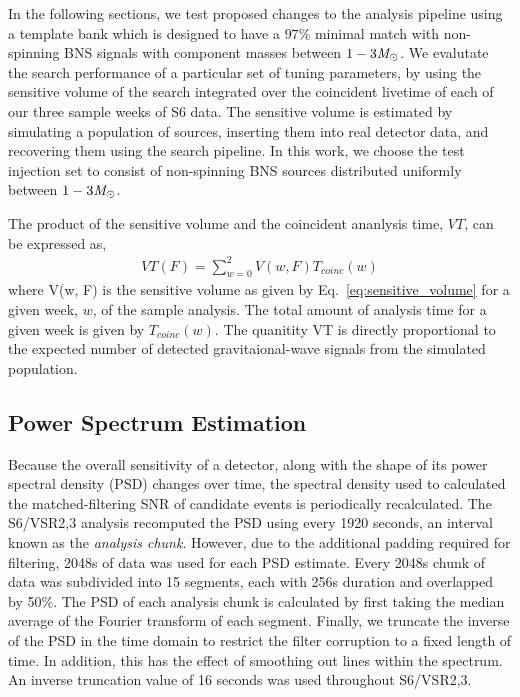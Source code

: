 In the following sections, we test proposed changes to the analysis pipeline using a template bank which is designed to have a $97\%$ minimal match with non-spinning BNS signals with component masses between $1-3 \mathit{M}_\odot$. We evalutate the search performance of a particular set of tuning parameters, by using the  sensitive volume of the search integrated over the coincident livetime of each of our three sample weeks of S6 data. The sensitive volume is estimated by simulating a population of sources, inserting them into real detector data, and recovering them using the search pipeline. In this work, we choose the test injection set to consist of non-spinning BNS sources distributed uniformly between $1-3 \mathit{M}_\odot$.

The product of the sensitive volume and the coincident ananlysis time, $VT$, can be expressed as,
%
\begin{eqnarray}
VT (F) = \sum_{w=0}^2 V(w, F) T_{coinc}(w)
\end{eqnarray}
%
where V(w, F) is the sensitive volume as given by Eq.~\ref{eq:sensitive_volume} for a given week, $w$, of the sample analysis. The total amount of analysis time for a given week is given by $T_{coinc}(w)$. The quanitity VT is directly proportional to the expected number of detected gravitaional-wave signals from the simulated population. 

\subsection{Power Spectrum Estimation}
\label{sec:psd}

Because the overall sensitivity of a detector, along with the shape of its power spectral density (PSD) changes over time, the spectral density used to calculated the matched-filtering SNR of candidate events is periodically recalculated. The S6/VSR2,3 analysis recomputed the PSD using every 1920 seconds, an interval known as the \emph{analysis chunk}. However, due to the additional padding required for filtering, 2048s of data was used for each PSD estimate. Every 2048s chunk of data was subdivided into 15 segments, each with 256s duration and overlapped by 50$\%$. The PSD of each analysis chunk is calculated by first taking the median average of the Fourier transform of each segment. Finally, we truncate the inverse of the PSD in the time domain to restrict the filter corruption to a fixed length of time. In addition, this has the effect of smoothing out lines within the spectrum. An inverse truncation value of 16 seconds was used throughout S6/VSR2,3. 

